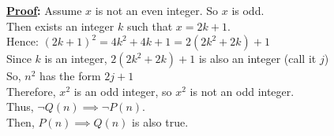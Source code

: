 \documentclass[a4paper]{article}
\begin{document}
\textbf{\underline{Proof}:} Assume $x$ is not an even integer. So $x$ is odd. \\
Then exists an integer $k$ such that $x = 2k + 1$. \\
Hence: $(2k + 1)^{2} = 4k^2 + 4k + 1 = 2(2k^2 + 2k) + 1$ \\
Since $k$ is an integer, $2(2k^2 + 2k) + 1$ is also an integer (call it $j$) \\
So, $n^2$ has the form $2j + 1$ \\
Therefore, $x^2$ is an odd integer, so $x^2$ is not an odd integer. \\
Thus, $\neg Q(n) \implies \neg P(n)$. \\
Then, $P(n) \implies Q(n)$ is also true. \\
\end{document}

